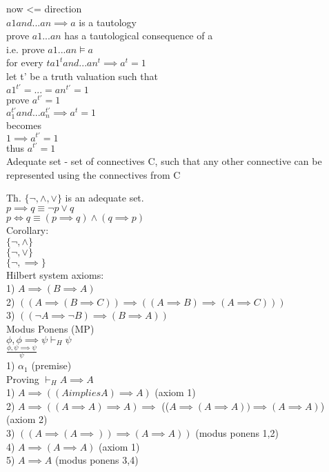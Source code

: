 \documentclass[12pt,oneside,notitlepage]{book}
\theoremstyle{definition}
\begin{document}
now <= direction \\
$a1 and ... an \implies a$ is a tautology \\
prove $a1...an$ has a tautological consequence of a \\
i.e. prove $a1...an \vDash a$ \\

for every $t a1^t and ...an^t \implies a^t = 1$ \\
let t' be a truth valuation such that \\
$a1^{t'} = ... = an^{t'} = 1$ \\
prove $a^{t'} = 1$ \\
$a_1^{t'} and ... a_n^{t'} \implies a^t = 1$ \\
becomes \\
$1 \implies a^{t'} = 1$ \\
thus $a^{t'} = 1$ \\

Adequate set - set of connectives C, such that any other connective can be represented using the connectives from C

Th. $\{ \neg, \land, \lor \}$ is an adequate set. \\
$p \implies q \equiv \neg p \lor q$ \\
$p \iff q \equiv (p \implies q) \land (q \implies p)$ \\
Corollary: \\
$\{ \neg, \land \}$ \\
$\{ \neg, \lor \}$ \\
$\{ \neg, \implies \}$ \\

Hilbert system axioms: \\
1) $A \implies (B \implies A)$ \\
2) $((A \implies (B \implies C)) \implies ((A \implies B) \implies (A \implies C)))$ \\
3) $((\neg A \implies \neg B) \implies (B \implies A))$ \\

Modus Ponens (MP) \\
${\phi, \phi \implies \psi} \vdash_H \psi$ \\
$\frac{\phi, \psi \implies \psi}{\psi}$ \\
1) $\alpha_1$ (premise) \\

Proving $\vdash_H A \implies A$ \\
1) $A \implies ((A implies A) \implies A)$ (axiom 1) \\
2) $A \implies (( A \implies A) \implies A) \implies$ (($A \implies (A \implies A)) \implies (A \implies A)$) (axiom 2) \\
3) $((A \implies (A \implies)) \implies (A \implies A))$ (modus ponens 1,2) \\
4) $A \implies (A \implies A)$ (axiom 1) \\
5) $A \implies A$ (modus ponens 3,4) \\
\end{document}
